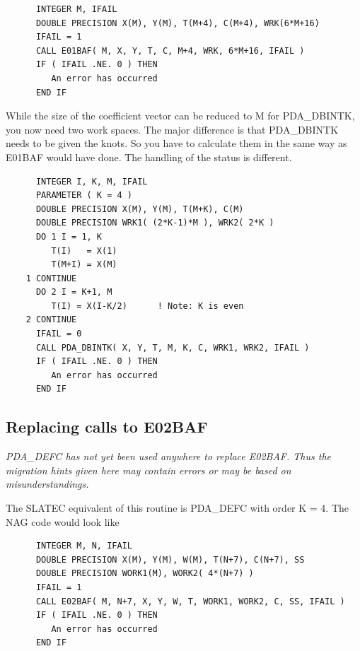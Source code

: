 \documentclass[11pt,twoside]{article}
\newcommand{\htmlref}[2]{#1}
\newcommand{\xlabel}[1]{}
\begin{document}
\begin{verbatim}
      INTEGER M, IFAIL
      DOUBLE PRECISION X(M), Y(M), T(M+4), C(M+4), WRK(6*M+16)
      IFAIL = 1
      CALL E01BAF( M, X, Y, T, C, M+4, WRK, 6*M+16, IFAIL )
      IF ( IFAIL .NE. 0 ) THEN
         An error has occurred
      END IF
\end{verbatim}

   While the size of the coefficient vector can be reduced to M for
   PDA\_DBINTK, you now need two work spaces.
   The major difference is that PDA\_DBINTK needs to be given the knots. So
   you have to calculate them in the same way as E01BAF would have done.
   The handling of the status is different.

\begin{verbatim}
      INTEGER I, K, M, IFAIL
      PARAMETER ( K = 4 )
      DOUBLE PRECISION X(M), Y(M), T(M+K), C(M)
      DOUBLE PRECISION WRK1( (2*K-1)*M ), WRK2( 2*K )
      DO 1 I = 1, K
         T(I)   = X(1)
         T(M+I) = X(M)
    1 CONTINUE
      DO 2 I = K+1, M
         T(I) = X(I-K/2)      ! Note: K is even
    2 CONTINUE
      IFAIL = 0
      CALL PDA_DBINTK( X, Y, T, M, K, C, WRK1, WRK2, IFAIL )
      IF ( IFAIL .NE. 0 ) THEN
         An error has occurred
      END IF
\end{verbatim}


\subsection{\xlabel{replacing_calls_to_e02baf}\label{m_e02baf}Replacing calls to E02BAF}

{\em
   PDA\_DEFC has not yet been used anywhere to replace E02BAF. Thus the
   migration hints given here may contain errors or may be based on
   misunderstandings.
\/}

   The SLATEC equivalent of this routine is
\htmlref{PDA\_DEFC}{PDA\_DEFC}
   with order K = 4. The
   NAG code would look like

\begin{verbatim}
      INTEGER M, N, IFAIL
      DOUBLE PRECISION X(M), Y(M), W(M), T(N+7), C(N+7), SS
      DOUBLE PRECISION WORK1(M), WORK2( 4*(N+7) )
      IFAIL = 1
      CALL E02BAF( M, N+7, X, Y, W, T, WORK1, WORK2, C, SS, IFAIL )
      IF ( IFAIL .NE. 0 ) THEN
         An error has occurred
      END IF
\end{verbatim}
\end{document}
